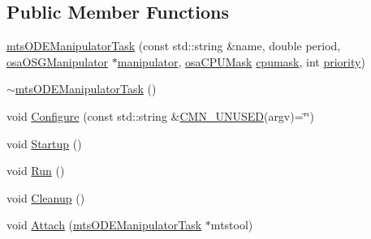\subsection*{Public Member Functions}
\begin{DoxyCompactItemize}
\item 
\hyperlink{classmts_o_d_e_manipulator_task_a96f32aa849ef22dda77166d79d7b0839}{mts\-O\-D\-E\-Manipulator\-Task} (const std\-::string \&name, double period, \hyperlink{classosa_o_s_g_manipulator}{osa\-O\-S\-G\-Manipulator} $\ast$\hyperlink{classmts_o_d_e_manipulator_task_af71c105f986e50bd23dd3a385bbf73d4}{manipulator}, \hyperlink{osa_c_p_u_affinity_8h_aaec7cdd7797e5e6eb5438c15fee5477a}{osa\-C\-P\-U\-Mask} \hyperlink{classmts_o_d_e_manipulator_task_aaff55dbeff38e947707c6b3405041622}{cpumask}, int \hyperlink{classmts_o_d_e_manipulator_task_ae2b16e466e4d216b2cf13ae89414696a}{priority})
\item 
\hyperlink{classmts_o_d_e_manipulator_task_a11cb81c6e94f83da977fe3c6715049ff}{$\sim$mts\-O\-D\-E\-Manipulator\-Task} ()
\item 
void \hyperlink{classmts_o_d_e_manipulator_task_a2860f6f53f1cf2383271b07ce1d9e627}{Configure} (const std\-::string \&\hyperlink{cmn_portability_8h_a021894e2626935fa2305434b1e893ff6}{C\-M\-N\-\_\-\-U\-N\-U\-S\-E\-D}(argv)=\char`\"{}\char`\"{})
\item 
void \hyperlink{classmts_o_d_e_manipulator_task_a005684eaa7c679b2798fb8b9e5d35514}{Startup} ()
\item 
void \hyperlink{classmts_o_d_e_manipulator_task_a4dd0bebf8a9287051fe198aa4e42b631}{Run} ()
\item 
void \hyperlink{classmts_o_d_e_manipulator_task_a143d7e3befbbce4a797d6f5cf12f3fca}{Cleanup} ()
\item 
void \hyperlink{classmts_o_d_e_manipulator_task_a3dbff6444a5b8299376e9db6ee4043bc}{Attach} (\hyperlink{classmts_o_d_e_manipulator_task}{mts\-O\-D\-E\-Manipulator\-Task} $\ast$mtstool)
\end{DoxyCompactItemize}
